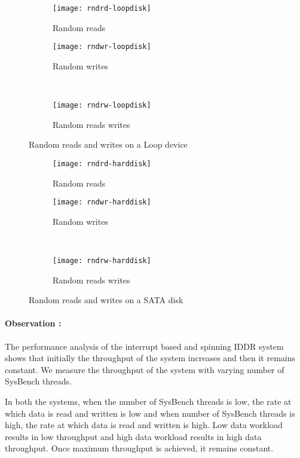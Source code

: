 \begin{figure}[!ht]
  \begin{subfigure}[b]{0.2\textwidth}
  \texttt{[image: rndrd-loopdisk]}
  \caption{Random reads}
  \label{subfig:rndrd-loopdisk}
  \end{subfigure}
  \hspace{50mm}
  \begin{subfigure}[b]{0.2\textwidth}
  \texttt{[image: rndwr-loopdisk]}
  \caption{Random writes}
  \label{subfig:rndwr-loopdisk}
  \end{subfigure}\\
  \begin{subfigure}[b]{0.3\textwidth}
  \texttt{[image: rndrw-loopdisk]}
  \caption{Random reads writes}
  \label{subfig:rndrw-loopdisk}
  \end{subfigure}
\caption{Random reads and writes on a Loop device}\label{fig:rndloopdisk}
\end{figure}

\begin{figure}[!ht]
  \begin{subfigure}[b]{0.2\textwidth}
  \texttt{[image: rndrd-harddisk]}
  \caption{Random reads}
  \label{subfig:rndrd-harddisk}
  \end{subfigure}
  \hspace{50mm}
  \begin{subfigure}[b]{0.2\textwidth}
  \texttt{[image: rndwr-harddisk]}
  \caption{Random writes}
  \label{subfig:rndwr-harddisk}
  \end{subfigure}\\
  \begin{subfigure}[b]{0.3\textwidth}
  \texttt{[image: rndrw-harddisk]}
  \caption{Random reads writes}
  \label{subfig:rndrw-harddisk}
  \end{subfigure}
\caption{Random reads and writes on a SATA disk}\label{fig:rndharddisk}
\end{figure}


\paragraph{Observation :}
The performance analysis of the interrupt based and spinning IDDR system shows that initially the throughput of the system increases and then it remains constant. We measure the throughput of the system with varying number of SysBench threads. 

In both the systems, when the number of SysBench threads is low, the rate at which data is read and written is low and when number of SysBench threads is high, the rate at which data is read and written is high. Low data workload results in low throughput and high data workload results in high data throughput. Once maximum throughput is achieved, it remains constant.

